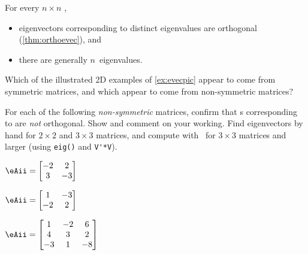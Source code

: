 \begin{exercise}  
For every \(n\times n\) ,
\begin{itemize}
\item  eigenvectors corresponding to distinct eigenvalues are orthogonal (\autoref{thm:orthoevec}), and
\item  there are generally \(n\)~eigenvalues.
\end{itemize}
Which of the illustrated 2D examples of \autoref{ex:evecpic} appear to come from symmetric matrices, and which appear to come from non-symmetric matrices?
\end{exercise}





\begin{exercise} \label{ex:smnoevs} 
For each of the following \emph{non-symmetric} matrices, confirm that s corresponding to  are \emph{not} orthogonal.  Show and comment on your working.
Find eigenvectors by hand for \(2\times 2\) and \(3\times 3\) matrices, and compute with \script\ for \(3\times 3\) matrices and larger (using \verb|eig()| and \verb|V'*V|).
\begin{Parts}
\item \(\eAii=\begin{bmatrix} -2&2
\\3&-3 \end{bmatrix}\)

\begin{reduce}
\item \(\eAii=\begin{bmatrix}1&-3
\\-2&2 \end{bmatrix}\)

\item \(\eAii=\begin{bmatrix} 1&-2&6
\\4&3&2
\\-3&1&-8 \end{bmatrix}\)
\end{reduce}


\end{Parts}
\end{exercise}
